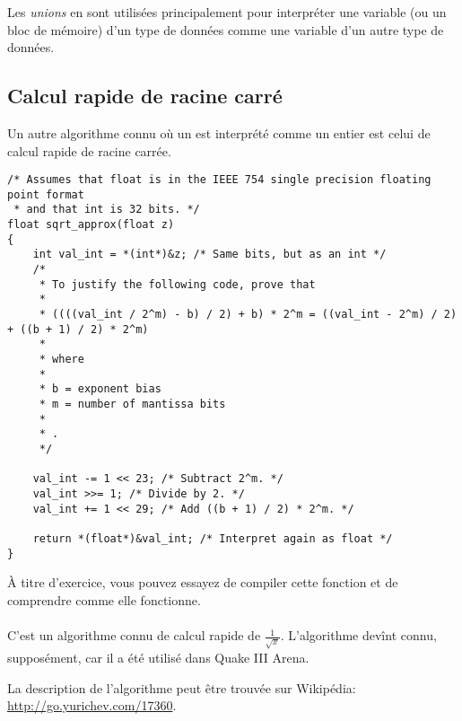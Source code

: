 
Les \emph{unions} en \CCpp sont utilisées principalement pour interpréter une variable
(ou un bloc de mémoire) d'un type de données comme une variable d'un autre type de données.





\subsection{Calcul rapide de racine carré}

Un autre algorithme connu où un \Tfloat est interprété comme un entier est celui
de calcul rapide de racine carrée.

\begin{lstlisting}[caption=Le code source provient de Wikipédia: \url{http://go.yurichev.com/17364},style=customc]
/* Assumes that float is in the IEEE 754 single precision floating point format
 * and that int is 32 bits. */
float sqrt_approx(float z)
{
    int val_int = *(int*)&z; /* Same bits, but as an int */
    /*
     * To justify the following code, prove that
     *
     * ((((val_int / 2^m) - b) / 2) + b) * 2^m = ((val_int - 2^m) / 2) + ((b + 1) / 2) * 2^m)
     *
     * where
     *
     * b = exponent bias
     * m = number of mantissa bits
     *
     * .
     */
 
    val_int -= 1 << 23; /* Subtract 2^m. */
    val_int >>= 1; /* Divide by 2. */
    val_int += 1 << 29; /* Add ((b + 1) / 2) * 2^m. */
 
    return *(float*)&val_int; /* Interpret again as float */
}
\end{lstlisting}

À titre d'exercice, vous pouvez essayez de compiler cette fonction et de comprendre
comme elle fonctionne.\\
\\
C'est un algorithme connu de calcul rapide de $\frac{1}{\sqrt{x}}$.
L'algorithme devînt connu, supposément, car il a été utilisé dans Quake III Arena.

La description de l'algorithme peut être trouvée sur Wikipédia: \url{http://go.yurichev.com/17360}.

